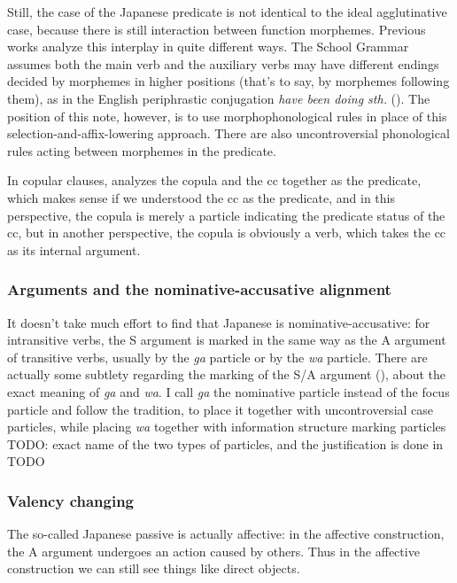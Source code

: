 \documentclass[UTF8, a4paper, oneside, scheme=plain]{ctexart}
\newcommand{\corpus}[1]{\emph{#1}}
\begin{document}
Still, the case of the Japanese predicate is not identical to the ideal agglutinative case,
because there is still interaction between function morphemes.
Previous works analyze this interplay in quite different ways.
The School Grammar assumes both the main verb and the auxiliary verbs may have different endings 
decided by morphemes in higher positions (that's to say, by morphemes following them),
as in the English periphrastic conjugation \corpus{have been doing sth.}
().
The position of this note, however, is to use morphophonological rules 
in place of this selection-and-affix-lowering approach.
There are also uncontroversial phonological rules acting between morphemes in the predicate.

In copular clauses,
\citet{tsutsui1989dictionary} analyzes the copula and the \acs{cc} together as the predicate,
which makes sense if we understood the \acs{cc} as the predicate,
and in this perspective, the copula is merely a particle indicating the predicate status of the \acs{cc},
but in another perspective, the copula is obviously a verb,
which takes the \acs{cc} as its internal argument.

\subsubsection{Arguments and the nominative-accusative alignment}\label{sec:alignment}

It doesn't take much effort to find that Japanese is nominative-accusative:
for intransitive verbs,
the S argument is marked in the same way as the A argument of transitive verbs,
usually by the \corpus{ga} particle or by the \corpus{wa} particle.
There are actually some subtlety regarding the marking of the S/A argument (),
about the exact meaning of \corpus{ga} and \corpus{wa}.
I call \corpus{ga} the nominative particle instead of the focus particle 
and follow the tradition, to place it together with uncontroversial case particles,
while placing \corpus{wa} together with information structure marking particles TODO: exact name of the two types of particles,
and the justification is done in TODO

\subsubsection{Valency changing}

The so-called Japanese passive is actually affective:
in the affective construction, the A argument undergoes an action caused by others. 
Thus in the affective construction we can still see things like direct objects.
\end{document}
